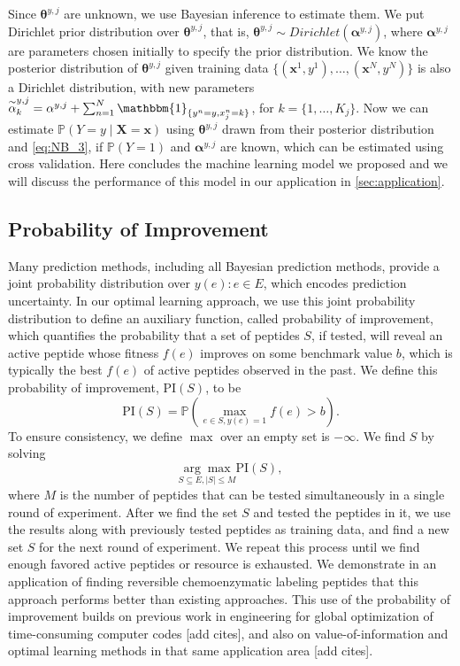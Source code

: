 \documentclass[11pt]{article}
\newcommand{\Prob}{\mathbb{P}}
\newcommand{\PI}{\text{PI}}
\begin{document}
Since $\bm{\theta}^{y, j}$ are unknown, we use Bayesian inference to estimate them. We put Dirichlet prior distribution over $\bm{\theta}^{y, j}$, that is, $\bm{\theta}^{y, j} \sim Dirichlet(\bm{\alpha}^{y, j})$, where $\bm{\alpha}^{y, j}$ are parameters chosen initially to specify the prior distribution. We know the posterior distribution of $\bm{\theta}^{y, j}$ given training data $\{(\bm{x}^1, y^1), \ldots, (\bm{x}^N, y^N)\}$ is also a Dirichlet distribution, with new parameters $\overset{\sim}{\alpha}^{y, j}_k = \alpha^{y, j} + \sum_{n=1}^N \mathbbm{1}_{\{y^n = y, x^n_j = k\}}$, for $k = \{1, \ldots, K_j\}$. Now we can estimate $\Prob(Y = y \mid \bm{X} = \bm{x})$ using $\bm{\theta}^{y, j}$ drawn from their posterior distribution and \eqref{eq:NB_3}, if $\Prob(Y = 1)$ and $\bm{\alpha}^{y, j}$ are known, which can be estimated using cross validation. Here concludes the machine learning model we proposed and we will discuss the performance of this model in our application in \ref{sec:application}.

\subsection{Probability of Improvement} \label{sec:prob improvement} 
Many prediction methods, including all Bayesian prediction methods, provide a joint probability distribution over $y(e): e \in E$, which encodes prediction uncertainty. In our optimal learning approach, we use this joint probability distribution to define an auxiliary function, called probability of improvement, which quantifies the probability that a set of peptides $S$, if tested, will reveal an active peptide whose fitness $f(e)$ improves on some benchmark value $b$, which is typically the best $f(e)$ of active peptides observed in the past. We define this probability of improvement, $\PI(S)$, to be
\begin{equation}
  \PI(S) = \Prob \left( \max_{e \in S, y(e)=1} f(e) > b \right).
  \label{}
\end{equation}
To ensure consistency, we define $\max$ over an empty set is $-\infty$. We find $S$ by solving
\begin{equation}
  \underset{S \subseteq E, |S| \leq M}{\arg\max} \PI(S),
  \label{eq:opt PI}
\end{equation}
where $M$ is the number of peptides that can be tested simultaneously in a single round of experiment. After we find the set $S$ and tested the peptides in it, we use the results along with previously tested peptides as training data, and find a new set $S$ for the next round of experiment. We repeat this process until we find enough favored active peptides or resource is exhausted. We demonstrate in an application of finding reversible chemoenzymatic labeling peptides that this approach performs better than existing approaches. This use of the probability of improvement builds on previous work in engineering for global optimization of time-consuming computer codes [add cites], and also on value-of-information and optimal learning methods in that same application area [add cites].
\end{document}
